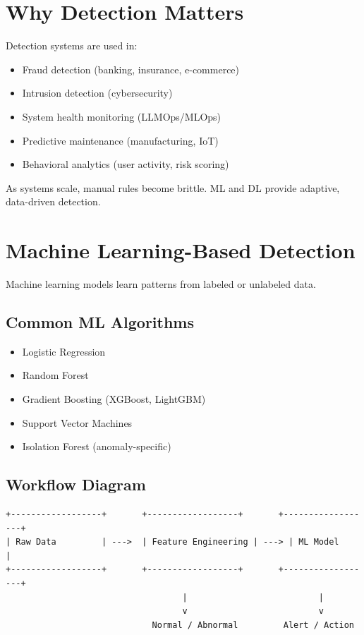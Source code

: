 \documentclass[12pt, draftclsnofoot, onecolumn]{IEEEtran}
\begin{document}
\section{Why Detection Matters}
Detection systems are used in:

\begin{itemize}
\item Fraud detection (banking, insurance, e-commerce)
\item Intrusion detection (cybersecurity)
\item System health monitoring (LLMOps/MLOps)
\item Predictive maintenance (manufacturing, IoT)
\item Behavioral analytics (user activity, risk scoring)
\end{itemize}

As systems scale, manual rules become brittle. ML and DL provide adaptive, data-driven detection.

\section{Machine Learning-Based Detection}
Machine learning models learn patterns from labeled or unlabeled data.

\subsection{Common ML Algorithms}
\begin{itemize}
\item Logistic Regression
\item Random Forest
\item Gradient Boosting (XGBoost, LightGBM)
\item Support Vector Machines
\item Isolation Forest (anomaly-specific)
\end{itemize}

\subsection{Workflow Diagram}
\begin{verbatim}
+------------------+       +------------------+       +------------------+
| Raw Data         | --->  | Feature Engineering | ---> | ML Model        |
+------------------+       +------------------+       +------------------+
                                   |                          |
                                   v                          v
                             Normal / Abnormal         Alert / Action
\end{verbatim}
\end{document}
